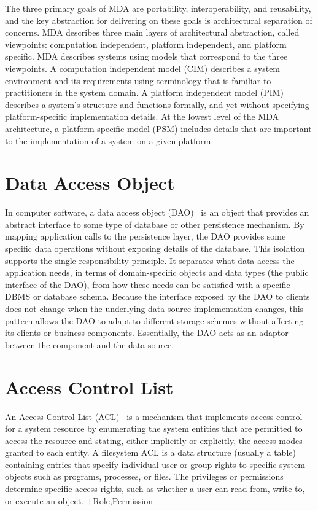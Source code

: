 	The three primary goals of MDA are portability, interoperability, and reusability, and the key abstraction for delivering on these goals is architectural separation of concerns. MDA describes three main layers of architectural abstraction, called viewpoints: computation independent, platform independent, and platform specific. MDA describes systems using models that correspond to the three viewpoints. A computation independent model (CIM) describes a system environment and its requirements using terminology that is familiar to practitioners in the system domain. A platform independent model (PIM) describes a system’s structure and functions formally, and yet without specifying platform-specific implementation details. At the lowest level of the MDA architecture, a platform specific model (PSM) includes details that are important to the implementation of a system on a given platform.


\section{Data Access Object}
\label{dao}
In computer software, a data access object (DAO)~\cite{DAO} is an object that provides an abstract interface to some type of database or other persistence mechanism. By mapping application calls to the persistence layer, the DAO provides some specific data operations without exposing details of the database. This isolation supports the single responsibility principle. It separates what data access the application needs, in terms of domain-specific objects and data types (the public interface of the DAO), from how these needs can be satisfied with a specific DBMS or database schema. Because the interface exposed by the DAO to clients does not change when the underlying data source implementation changes, this pattern allows the DAO to adapt to different storage schemes without affecting its clients or business components. Essentially, the DAO acts as an adaptor between the component and the data source.

\section{Access Control List}
\label{acl}
An Access Control List (ACL)~\cite{shirey2007internet} is a mechanism that implements access control for a system resource by enumerating the system 	entities that are permitted to access the resource and stating, either implicitly or explicitly, the access modes granted to each entity. A filesystem ACL is a data structure (usually a table) containing entries that specify individual user or group rights to specific system objects such as programs, processes, or files. The privileges or permissions determine specific access rights, such as whether a user can read from, write to, or execute an object. +Role,Permission

